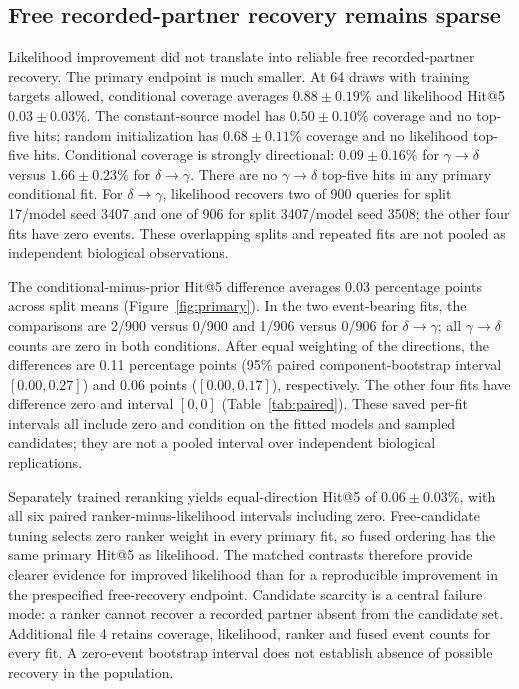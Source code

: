\documentclass[12pt]{article}
\newcommand{\gtd}{\mbox{\ensuremath{\gamma\!\rightarrow\!\delta}}}
\newcommand{\dtg}{\mbox{\ensuremath{\delta\!\rightarrow\!\gamma}}}
\begin{document}
\subsection{Free recorded-partner recovery remains sparse}
Likelihood improvement did not translate into reliable free recorded-partner
recovery. The primary endpoint is much smaller. At 64 draws with
training targets allowed, conditional coverage averages $0.88\pm0.19\%$ and
likelihood Hit@5 $0.03\pm0.03\%$. The constant-source model has
$0.50\pm0.10\%$ coverage and no top-five hits; random initialization has
$0.68\pm0.11\%$ coverage and no likelihood top-five hits. Conditional coverage
is strongly directional: $0.09\pm0.16\%$ for \gtd{} versus
$1.66\pm0.23\%$ for \dtg{}. There are no \gtd{} top-five hits in any primary
conditional fit. For \dtg{}, likelihood recovers two of 900 queries for
split 17/model seed 3407 and one of 906 for split 3407/model seed 3508;
the other four fits have zero events. These overlapping splits and repeated
fits are not pooled as independent biological observations.

The conditional-minus-prior Hit@5 difference averages 0.03 percentage points
across split means (Figure~\ref{fig:primary}). In the two event-bearing fits,
the comparisons are 2/900 versus 0/900 and 1/906 versus 0/906 for \dtg{};
all \gtd{} counts are zero in both conditions. After equal weighting of the
directions, the differences are 0.11 percentage points (95\% paired
component-bootstrap interval $[0.00,0.27]$) and 0.06 points ($[0.00,0.17]$),
respectively. The other four fits have difference zero and interval $[0,0]$
(Table~\ref{tab:paired}). These saved per-fit intervals all include zero and
condition on the fitted models and sampled candidates; they are not a pooled
interval over independent biological replications.

Separately trained reranking yields equal-direction Hit@5 of $0.06\pm0.03\%$, with
all six paired ranker-minus-likelihood intervals including zero. Free-candidate
tuning selects zero ranker weight in every primary fit, so fused ordering has
the same primary Hit@5 as likelihood. The matched contrasts therefore provide
clearer evidence for improved likelihood than for a reproducible improvement
in the prespecified free-recovery endpoint. Candidate scarcity is a central failure mode: a ranker cannot recover a
recorded partner absent from the candidate set. Additional file 4 retains
coverage, likelihood, ranker and fused event counts for every fit. A zero-event
bootstrap interval does not establish absence of possible recovery in the population.
\end{document}
